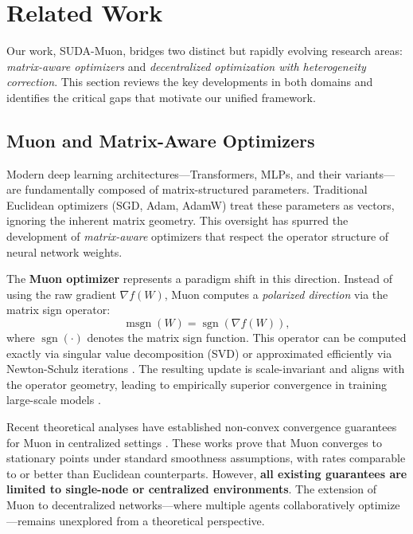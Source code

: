 \section{Related Work}

Our work, SUDA-Muon, bridges two distinct but rapidly evolving research areas: \emph{matrix-aware optimizers} and \emph{decentralized optimization with heterogeneity correction}. This section reviews the key developments in both domains and identifies the critical gaps that motivate our unified framework.

\subsection{Muon and Matrix-Aware Optimizers}

Modern deep learning architectures---Transformers, MLPs, and their variants---are fundamentally composed of matrix-structured parameters. Traditional Euclidean optimizers (SGD, Adam, AdamW) treat these parameters as vectors, ignoring the inherent matrix geometry. This oversight has spurred the development of \emph{matrix-aware} optimizers that respect the operator structure of neural network weights.

The \textbf{Muon optimizer} \cite{jordanmuon} represents a paradigm shift in this direction. Instead of using the raw gradient $\nabla f(W)$, Muon computes a \emph{polarized direction} via the matrix sign operator:
\[
\operatorname{msgn}(W) = \operatorname{sgn}(\nabla f(W)),
\]
where $\operatorname{sgn}(\cdot)$ denotes the matrix sign function. This operator can be computed exactly via singular value decomposition (SVD) or approximated efficiently via Newton-Schulz iterations \cite{amsel2025polar, grishina2025accelerating}. The resulting update is scale-invariant and aligns with the operator geometry, leading to empirically superior convergence in training large-scale models \cite{huang2025limuon, he2025lowrank}.

Recent theoretical analyses have established non-convex convergence guarantees for Muon in centralized settings \cite{sato2025convergence}. These works prove that Muon converges to stationary points under standard smoothness assumptions, with rates comparable to or better than Euclidean counterparts. However, \textbf{all existing guarantees are limited to single-node or centralized environments}. The extension of Muon to decentralized networks---where multiple agents collaboratively optimize---remains unexplored from a theoretical perspective.

